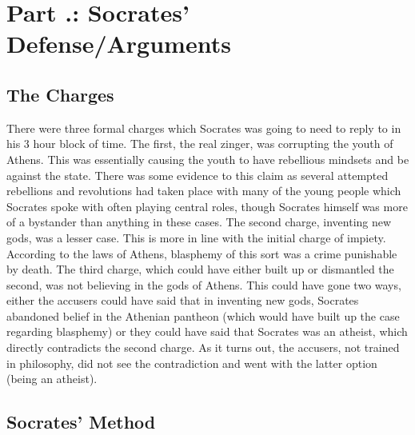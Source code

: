 \section{Part \thechapcount.\theseccount: Socrates' Defense/Arguments}

\subsection{The Charges}

There were three formal charges which Socrates was going to need to reply to in his 3 hour block of time. The first, the real zinger, was corrupting the youth of Athens. This was essentially causing the youth to have rebellious mindsets and be against the state. There was some evidence to this claim as several attempted rebellions and revolutions had taken place with many of the young people which Socrates spoke with often playing central roles, though Socrates himself was more of a bystander than anything in these cases.  The second charge, inventing new gods, was a lesser case. This is more in line with the initial charge of impiety. According to the laws of Athens, blasphemy of this sort was a crime punishable by death.  The third charge, which could have either built up or dismantled the second, was not believing in the gods of Athens. This could have gone two ways, either the accusers could have said that in inventing new gods, Socrates abandoned belief in the Athenian pantheon (which would have built up the case regarding blasphemy) or they could have said that Socrates was an atheist, which directly contradicts the second charge. As it turns out, the accusers, not trained in philosophy, did not see the contradiction and went with the latter option (being an atheist).
\subsection{Socrates' Method}

